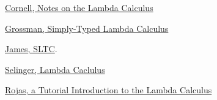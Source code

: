 \bigskip

\begin{thebibliography}


 \href{https://www.cs.cornell.edu/courses/cs312/2008sp/recitations/rec26.html}{Cornell, Notes on the Lambda Calculus}

 \href{https://homes.cs.washington.edu/~djg/2011sp/lec9.pdf}{Grossman, Simply-Typed Lambda Calculus}

 \href{http://therisingsea.org/notes/talk-james-simplytyped.pdf}{James, SLTC}. 

 \href{https://www.irif.fr/~mellies/mpri/mpri-ens/biblio/Selinger-Lambda-Calculus-Notes.pdf}{Selinger, Lambda Caclulus}

 \href{https://www.inf.fu-berlin.de/lehre/WS03/alpi/lambda.pdf}{Rojas, a Tutorial Introduction to the Lambda Calculus}

\end{thebibliography}

